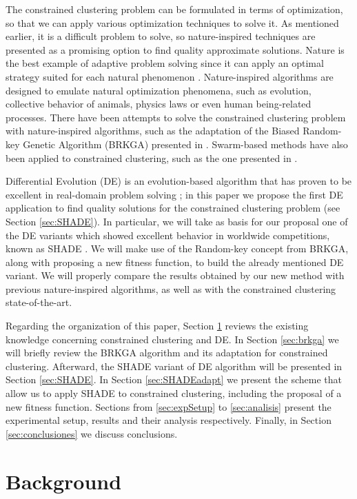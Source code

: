 \documentclass[review]{elsarticle}
\begin{document}
The constrained clustering problem can be formulated in terms of optimization, so that we can apply various optimization techniques to solve it. As mentioned earlier, it is a difficult problem to solve, so nature-inspired techniques are presented as a promising option to find quality approximate solutions. Nature is the best example of adaptive problem solving since it can apply an optimal strategy suited for each natural phenomenon \cite{fausto2019ants}. Nature-inspired algorithms are designed to emulate natural optimization phenomena, such as evolution, collective behavior of animals, physics laws or even human being-related processes. There have been attempts to solve the constrained clustering problem with nature-inspired algorithms, such as the adaptation of the Biased Random-key Genetic Algorithm (BRKGA) presented in \cite{de2017comparison}. Swarm-based methods have also been applied to constrained clustering, such as the one presented in \cite{xu2013improving}.

Differential Evolution (DE) is an evolution-based algorithm that has proven to be excellent in real-domain problem solving \cite{das2011differential}; in this paper we propose the first DE application to find quality solutions for the constrained clustering problem (see Section \ref{sec:SHADE}). In particular, we will take as basis for our proposal one of the DE variants which showed excellent behavior in worldwide competitions, known as SHADE \cite{molina2018insight}. We will make use of the Random-key concept from BRKGA, along with proposing a new fitness function, to build the already mentioned DE variant. We will properly compare the results obtained by our new method with previous nature-inspired algorithms, as well as with the constrained clustering state-of-the-art.

Regarding the organization of this paper, Section \ref{sec:background} reviews the existing knowledge concerning constrained clustering and DE. In Section \ref{sec:brkga} we will briefly review the BRKGA algorithm and its adaptation for constrained clustering. Afterward, the SHADE variant of DE algorithm will be presented in Section \ref{sec:SHADE}. In Section \ref{sec:SHADEadapt} we present the scheme that allow us to apply SHADE to constrained clustering, including the proposal of a new fitness function. Sections from \ref{sec:expSetup} to \ref{sec:analisis} present the experimental setup, results and their analysis respectively. Finally, in Section \ref{sec:conclusiones} we discuss conclusions.

\section{Background} \label{sec:background}
\end{document}
